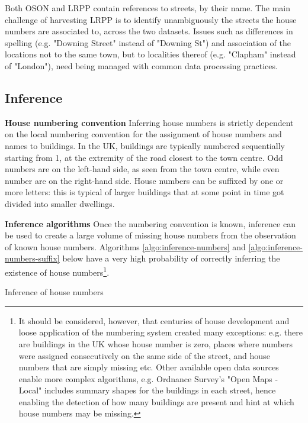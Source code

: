Both OSON and LRPP contain references to streets, by their name. The main challenge of harvesting LRPP is to identify unambiguously the streets the house numbers are associated to, across the two datasets. Issues such as differences in spelling (e.g. "Downing Street" instead of "Downing St") and association of the locations not to the same town, but to localities thereof (e.g. "Clapham" instead of "London"), need being managed with common data processing practices.

\subsection{Inference} 
\label{inference-algorithms} 

\textbf{House numbering convention} Inferring house numbers is strictly dependent on the local numbering convention for the assignment of house numbers and names to buildings. In the UK, buildings are typically numbered sequentially starting from 1, at the extremity of the road closest to the town centre. Odd numbers are on the left-hand side, as seen from the town centre, while even number are on the right-hand side. House numbers can be suffixed by one or more letters: this is typical of larger buildings that at some point in time got divided into smaller dwellings. 
        
\textbf{Inference algorithms} Once the numbering convention is known, inference can be used to create a large volume of missing house numbers from the observation of known house numbers. Algorithms \ref{algo:inference-numbers} and \ref{algo:inference-numbers-suffix} below have a very high probability of correctly inferring the existence of house numbers\footnote{It should be considered, however, that centuries of house development and loose application of the numbering system created many exceptions: e.g. there are buildings in the UK whose house number is zero, places where numbers were assigned consecutively on the same side of the street, and house numbers that are simply missing etc. Other available open data sources enable more complex algorithms, e.g. Ordnance Survey's "Open Maps - Local" includes summary shapes for the buildings in each street, hence enabling the detection of how many buildings are present and hint at which house numbers may be missing.}. 

\vspace{5mm}

\begin{algorithm}[H]
    \caption{Inference of house numbers}
    \label{algo:inference-numbers}
\end{algorithm}


